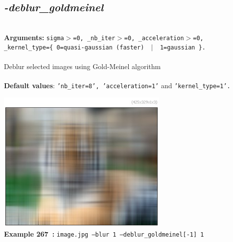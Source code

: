\documentclass[a4paper,11pt,twoside]{book}
\begin{document}
\subsection{\emph{-deblur\_goldmeinel} }\vspace*{-0.5em}
~\\\textbf{Arguments: } 
{\small \texttt{sigma$>$=0, \_nb\_iter$>$=0, \_acceleration$>$=0, \_kernel\_type=\{ 0=quasi-gaussian (faster) ~$|$~ 1=gaussian \}.}}\\~\\
Deblur selected images using Gold-Meinel algorithm
~\\~\\\textbf{Default values}: {\small \texttt{'nb\_iter=8', 'acceleration=1'} and \texttt{'kernel\_type=1'.}}
\begin{center}\includegraphics[keepaspectratio=true,height=7cm,width=\textwidth]{img/gmic_def267.jpg}\\
{\footnotesize \textbf{Example 267~:} \texttt{image.jpg --blur 1 --deblur\_goldmeinel[-1] 1}}
\end{center}
\end{document}
